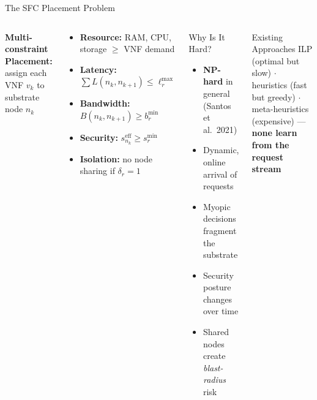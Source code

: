 \begin{frame}{The SFC Placement Problem}
  \begin{columns}[T]
      \textbf{Multi-constraint Placement:} assign each VNF $v_k$ to substrate node $n_k$
      \vspace{4pt}
      \begin{tcolorbox}[colback=lightgray, colframe=cuired, title=Hard Constraints, fonttitle=\small\bfseries]
        \footnotesize
        \begin{itemize}
          \item \textbf{Resource:} RAM, CPU, storage $\geq$ VNF demand
          \item \textbf{Latency:} $\sum L(n_k, n_{k+1}) \leq \ell_r^{\max}$
          \item \textbf{Bandwidth:} $B(n_k,n_{k+1}) \geq b_r^{\min}$
          \item \textbf{Security:} $s_{n_k}^{\text{eff}} \geq s_r^{\min}$
          \item \textbf{Isolation:} no node sharing if $\delta_r=1$
        \end{itemize}
      \end{tcolorbox}
      \begin{alertblock}{Why Is It Hard?}
        \begin{itemize}
          \item \textbf{NP-hard} in general (Santos et al.\ 2021)
          \item Dynamic, online arrival of requests
          \item Myopic decisions fragment the substrate
          \item Security posture changes over time
          \item Shared nodes create \emph{blast-radius} risk
        \end{itemize}
      \end{alertblock}
      \vspace{4pt}
      \begin{block}{Existing Approaches}
        \footnotesize
        ILP (optimal but slow) $\cdot$ heuristics (fast but greedy) $\cdot$ meta-heuristics (expensive) --- \textbf{none learn from the request stream}
      \end{block}
  \end{columns}
\end{frame}

